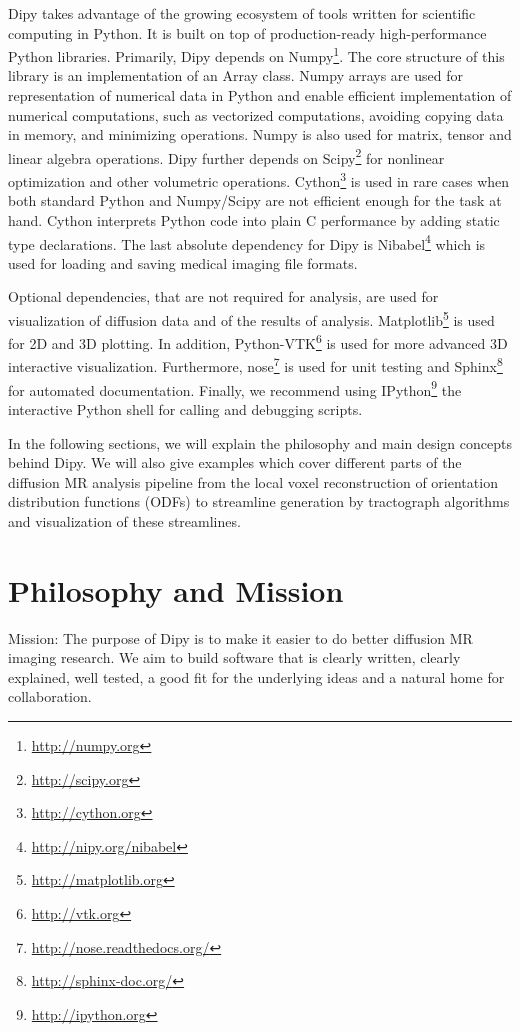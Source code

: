 \documentclass{bioinfo}
\begin{document}
Dipy takes advantage of the growing ecosystem of tools written for scientific
computing in Python. It is built on top of production-ready high-performance
Python libraries. Primarily, Dipy depends on
Numpy\footnote{\url{http://numpy.org}}. The core structure of this library is
an implementation of an Array \citep{van_numpy:11} class. Numpy arrays are used
for representation of numerical data in Python and enable efficient
implementation of numerical computations, such as vectorized computations,
avoiding copying data in memory, and minimizing operations. Numpy is also used
for matrix, tensor and linear algebra operations.  Dipy further depends on
Scipy\footnote{\url{http://scipy.org}} for nonlinear optimization and other
volumetric operations. Cython\footnote{\url{http://cython.org}} is used in rare
cases when both standard Python and Numpy/Scipy are not efficient enough for
the task at hand. Cython interprets Python code into plain C performance by
adding static type declarations. The last absolute dependency for Dipy is
Nibabel\footnote{\url{http://nipy.org/nibabel}} which is used for loading and
saving medical imaging file formats.

Optional dependencies, that are not required for analysis, are used for
visualization of diffusion data and of the results of
analysis. Matplotlib\footnote{\url{http://matplotlib.org}} is used for 2D and
3D plotting. In addition, Python-VTK\footnote{\url{http://vtk.org}} is used for
more advanced 3D interactive visualization. Furthermore, nose\footnote{\url{http://nose.readthedocs.org/}}
is used for unit
testing and Sphinx\footnote{\url{http://sphinx-doc.org/}} for automated
documentation. Finally, we recommend using
IPython\footnote{\url{http://ipython.org}} the interactive Python shell for
calling and debugging scripts.

In the following sections, we will explain the philosophy and main design
concepts behind Dipy. We will also give examples which cover different parts of
the diffusion MR analysis pipeline from the local voxel reconstruction of
orientation distribution functions (ODFs) to streamline generation by
tractograph algorithms and visualization of these streamlines.

\section{Philosophy and Mission}

Mission: The purpose of Dipy is to make it easier to do better diffusion MR
imaging research. We aim to build software that is clearly written, clearly
explained, well tested, a good fit for the underlying ideas and a natural home
for collaboration.
\end{document}
